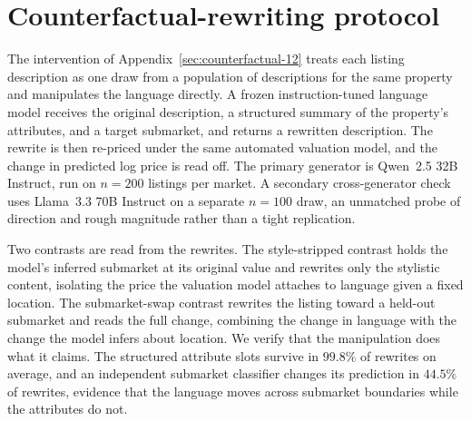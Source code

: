\section{Counterfactual-rewriting protocol}
\label{app:counterfactual}

The intervention of Appendix~\ref{sec:counterfactual-12} treats each listing description as one draw from a population of descriptions for the same property and manipulates the language directly. A frozen instruction-tuned language model receives the original description, a structured summary of the property's attributes, and a target submarket, and returns a rewritten description. The rewrite is then re-priced under the same automated valuation model, and the change in predicted log price is read off. The primary generator is Qwen~2.5 32B Instruct, run on $n = 200$ listings per market. A secondary cross-generator check uses Llama~3.3 70B Instruct on a separate $n = 100$ draw, an unmatched probe of direction and rough magnitude rather than a tight replication.

Two contrasts are read from the rewrites. The style-stripped contrast holds the model's inferred submarket at its original value and rewrites only the stylistic content, isolating the price the valuation model attaches to language given a fixed location. The submarket-swap contrast rewrites the listing toward a held-out submarket and reads the full change, combining the change in language with the change the model infers about location. We verify that the manipulation does what it claims. The structured attribute slots survive in $99.8\%$ of rewrites on average, and an independent submarket classifier changes its prediction in $44.5\%$ of rewrites, evidence that the language moves across submarket boundaries while the attributes do not.

